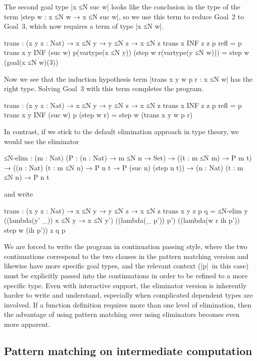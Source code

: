 The second goal type |x ≤N suc w| looks like the conclusion in the type of the term |step w : x ≤N w → x ≤N suc w|, so we use this term to reduce Goal~2 to Goal~3, which now requires a term of type |x ≤N w|.
\begin{code}
trans : (x y z : Nat) → x ≤N y → y ≤N z → x ≤N z
trans x  INF  z       z        p                   refl                         = p
trans x       y  INF  (suc w)  p(vartype(x ≤N y))  (step w r(vartype(y ≤N w)))  = step w (goal(x ≤N w)(3))
\end{code}
Now we see that the induction hypothesis term |trans x y w p r : x ≤N w| has the right type.
Solving Goal~3 with this term completes the program.
\begin{code}
trans : (x y z : Nat) → x ≤N y → y ≤N z → x ≤N z
trans x  INF  z       z        p refl        = p
trans x       y  INF  (suc w)  p (step w r)  = step w (trans x y w p r)
\end{code}
In contrast, if we stick to the default elimination approach in type theory, we would use the eliminator
\begin{code}
≤N-elim :  (m : Nat) (P : (n : Nat) → m ≤N n → Set) →
           ((t : m ≤N m) → P m t) →
           ((n : Nat) (t : m ≤N n) → P n t → P (suc n) (step n t)) →
           (n : Nat) (t : m ≤N n) → P n t
\end{code}
and write
\begin{code}
trans : (x y z : Nat) → x ≤N y → y ≤N z → x ≤N z
trans x y z p q = ≤N-elim y  ((lambda(y' _)) x ≤N y → x ≤N y')
                             ((lambda(_ p')) p') ((lambda(w r ih p')) step w (ih p')) z q p
\end{code}
We are forced to write the program in continuation passing style, where the two continuations correspond to the two clauses in the pattern matching version and likewise have more specific goal types, and the relevant context (|p|~in this case) must be explicitly passed into the continuations in order to be refined to a more specific type.
Even with interactive support, the eliminator version is inherently harder to write and understand, especially when complicated dependent types are involved.
If a function definition requires more than one level of elimination, then the advantage of using pattern matching over using eliminators becomes even more apparent.

\subsection{Pattern matching on intermediate computation}
\label{sec:with}

